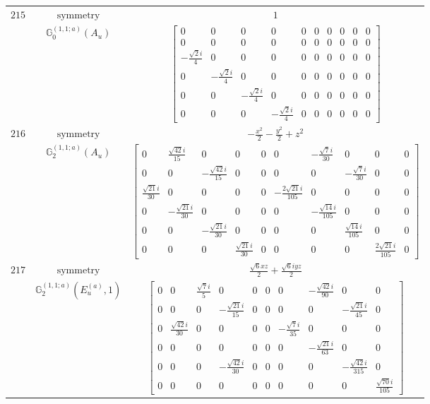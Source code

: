 \documentclass[fleqn,8pt,landscape]{jsarticle}
\begin{document}
\begin{longtable}{ccc}
$ 215 $ & $ \text{symmetry} $ & $ 1 $ \\
$  $ & $ \mathbb{G}_{0}^{(1,1;a)}(A_{u}) $ & $ \begin{bmatrix} 0 & 0 & 0 & 0 & 0 & 0 & 0 & 0 & 0 & 0 \\ 0 & 0 & 0 & 0 & 0 & 0 & 0 & 0 & 0 & 0 \\ - \frac{\sqrt{2} i}{4} & 0 & 0 & 0 & 0 & 0 & 0 & 0 & 0 & 0 \\ 0 & - \frac{\sqrt{2} i}{4} & 0 & 0 & 0 & 0 & 0 & 0 & 0 & 0 \\ 0 & 0 & - \frac{\sqrt{2} i}{4} & 0 & 0 & 0 & 0 & 0 & 0 & 0 \\ 0 & 0 & 0 & - \frac{\sqrt{2} i}{4} & 0 & 0 & 0 & 0 & 0 & 0 \end{bmatrix} $ \\ \hline
$ 216 $ & $ \text{symmetry} $ & $ - \frac{x^{2}}{2} - \frac{y^{2}}{2} + z^{2} $ \\
$  $ & $ \mathbb{G}_{2}^{(1,1;a)}(A_{u}) $ & $ \begin{bmatrix} 0 & \frac{\sqrt{42} i}{15} & 0 & 0 & 0 & 0 & - \frac{\sqrt{7} i}{30} & 0 & 0 & 0 \\ 0 & 0 & - \frac{\sqrt{42} i}{15} & 0 & 0 & 0 & 0 & - \frac{\sqrt{7} i}{30} & 0 & 0 \\ \frac{\sqrt{21} i}{30} & 0 & 0 & 0 & 0 & - \frac{2 \sqrt{21} i}{105} & 0 & 0 & 0 & 0 \\ 0 & - \frac{\sqrt{21} i}{30} & 0 & 0 & 0 & 0 & - \frac{\sqrt{14} i}{105} & 0 & 0 & 0 \\ 0 & 0 & - \frac{\sqrt{21} i}{30} & 0 & 0 & 0 & 0 & \frac{\sqrt{14} i}{105} & 0 & 0 \\ 0 & 0 & 0 & \frac{\sqrt{21} i}{30} & 0 & 0 & 0 & 0 & \frac{2 \sqrt{21} i}{105} & 0 \end{bmatrix} $ \\ \hline
$ 217 $ & $ \text{symmetry} $ & $ \frac{\sqrt{6} x z}{2} + \frac{\sqrt{6} i y z}{2} $ \\
$  $ & $ \mathbb{G}_{2}^{(1,1;a)}(E_{u}^{(a)},1) $ & $ \begin{bmatrix} 0 & 0 & \frac{\sqrt{7} i}{5} & 0 & 0 & 0 & 0 & - \frac{\sqrt{42} i}{90} & 0 & 0 \\ 0 & 0 & 0 & - \frac{\sqrt{21} i}{15} & 0 & 0 & 0 & 0 & - \frac{\sqrt{21} i}{45} & 0 \\ 0 & \frac{\sqrt{42} i}{30} & 0 & 0 & 0 & 0 & - \frac{\sqrt{7} i}{35} & 0 & 0 & 0 \\ 0 & 0 & 0 & 0 & 0 & 0 & 0 & - \frac{\sqrt{21} i}{63} & 0 & 0 \\ 0 & 0 & 0 & - \frac{\sqrt{42} i}{30} & 0 & 0 & 0 & 0 & - \frac{\sqrt{42} i}{315} & 0 \\ 0 & 0 & 0 & 0 & 0 & 0 & 0 & 0 & 0 & \frac{\sqrt{70} i}{105} \end{bmatrix} $ \\ \hline

\end{longtable}
\end{document}
